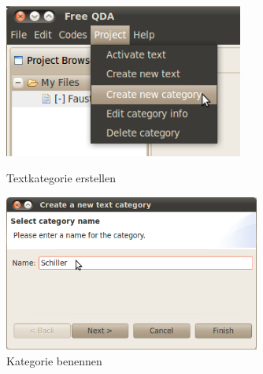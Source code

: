 \begin{figure}[!hbt]
\begin{minipage}[!hb!]{0.42\textwidth}\scriptsize
	\centering
	 \includegraphics[width=0.7\textwidth]{img/createnewcategory}
	\caption{Textkategorie erstellen}
	\label{fig:createnewcategory}
\end{minipage}
\hfill
\begin{minipage}[!hb!]{0.41\textwidth}
	\centering
	 \includegraphics[width=0.75\textwidth]{img/newcategoryname}
	\caption{Kategorie benennen}
	\label{fig:newcategoryname}
\end{minipage}
\hfill
\begin{minipage}[!hb!]{0.15\textwidth}
	\centering \vspace{-26pt}

\end{minipage}
\end{figure}
